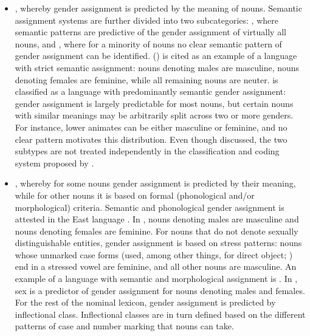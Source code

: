 \documentclass[output=collectionpaper]{langsci/langscibook}
\begin{document}
\begin{itemize}
\item {}, whereby gender assignment is predicted by the meaning of nouns. Semantic assignment systems are further divided into two subcategories: , where semantic patterns are predictive of the gender assignment of virtually all nouns, and , where for a minority of nouns no clear semantic pattern of gender assignment can be identified.  () is cited as an example of a language with strict semantic assignment: nouns denoting males are masculine, nouns denoting females are feminine, while all remaining nouns are neuter.  is classified as a language with predominantly semantic gender assignment: gender assignment is largely predictable for most nouns, but certain nouns with similar meanings may be arbitrarily split across two or more genders. For instance, lower animates can be either masculine or feminine, and no clear pattern motivates this distribution. Even though discussed, the two subtypes are not treated independently in the classification and coding system proposed by \cite{Corbett2013b}.
\item {}, whereby for some nouns gender assignment is predicted by their meaning, while for other nouns it is based on formal (phonological and/or morphological) criteria. Semantic and phonological gender assignment is attested in the East  language . In , nouns denoting males are masculine and nouns denoting females are feminine. For nouns that do not denote sexually distinguishable entities, gender assignment is based on stress patterns: nouns whose unmarked case forms (used, among other things, for direct object; \citealt[225]{Parker1985}) end in a stressed vowel are feminine, and all other nouns are masculine. An example of a language with semantic and morphological assignment is . In , sex is a predictor of gender assignment for nouns denoting males and females. For the rest of the nominal lexicon, gender assignment is predicted by inflectional class. Inflectional classes are in turn defined based on the different patterns of case and number marking that nouns can take.
\end{itemize}
\end{document}
